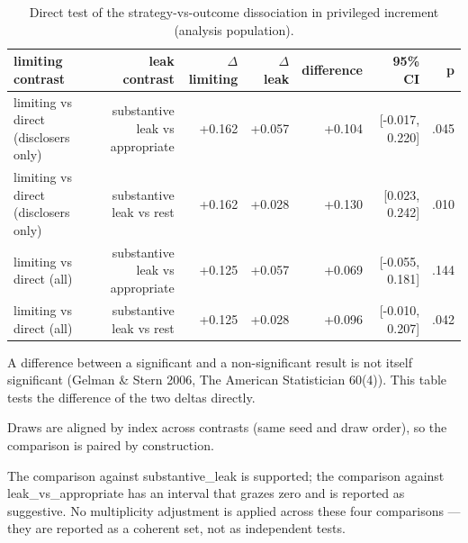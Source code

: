 \begin{table}[t]
\centering
\begin{threeparttable}
\caption{Direct test of the strategy-vs-outcome dissociation in privileged increment (analysis population).}
\label{tab:tab-dissociation-216}
\small
\begin{tabular}{lrrrrrr}
\toprule
limiting contrast & leak contrast & $\Delta$ limiting & $\Delta$ leak & difference & 95\% CI & p \\
\midrule
limiting vs direct (disclosers only) & substantive leak vs appropriate & +0.162 & +0.057 & +0.104 & [-0.017, 0.220] & .045 \\
limiting vs direct (disclosers only) & substantive leak vs rest & +0.162 & +0.028 & +0.130 & [0.023, 0.242] & .010 \\
limiting vs direct (all) & substantive leak vs appropriate & +0.125 & +0.057 & +0.069 & [-0.055, 0.181] & .144 \\
limiting vs direct (all) & substantive leak vs rest & +0.125 & +0.028 & +0.096 & [-0.010, 0.207] & .042 \\
\bottomrule
\end{tabular}
\begin{tablenotes}[flushleft]\footnotesize
\item A difference between a significant and a non-significant result is not itself significant (Gelman \& Stern 2006, The American Statistician 60(4)). This table tests the difference of the two deltas directly.
\item Draws are aligned by index across contrasts (same seed and draw order), so the comparison is paired by construction.
\item The comparison against substantive\_leak is supported; the comparison against leak\_vs\_appropriate has an interval that grazes zero and is reported as suggestive. No multiplicity adjustment is applied across these four comparisons --- they are reported as a coherent set, not as independent tests.
\end{tablenotes}
\end{threeparttable}
\end{table}
